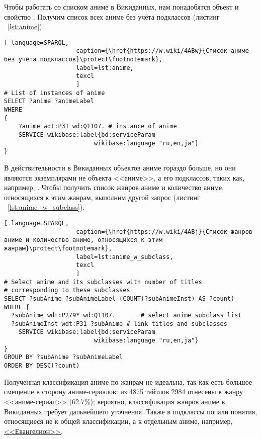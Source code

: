 Чтобы работать со списком аниме в Викиданных, нам понадобятся объект  и свойство . Получим список всех аниме без учёта подклассов (листинг ~\protect\ref{lst:anime}).

\begin{lstlisting}[ language=SPARQL, 
                    caption={\href{https://w.wiki/4ABw}{Список аниме без учёта подклассов}\protect\footnotemark},
                    label=lst:anime,
                    texcl 
                    ]
# List of instances of anime
SELECT ?anime ?animeLabel
WHERE
{
    ?anime wdt:P31 wd:Q1107. # instance of anime
    SERVICE wikibase:label{bd:serviceParam
					     wikibase:language "ru,en,ja"}
}
\end{lstlisting}%

В действительности в Викиданных объектов аниме гораздо больше, но они являются экземплярами не объекта <<аниме>>, а его подклассов, таких как, например, . Чтобы получить список жанров аниме и количество аниме, относящихся к этим жанрам, выполним другой запрос (листинг ~\protect\ref{lst:anime_w_subclass}).

\begin{lstlisting}[ language=SPARQL, 
                    caption={\href{https://w.wiki/4ABj}{Список жанров аниме и количество аниме, относящихся к этим жанрам}\protect\footnotemark},
                    label=lst:anime_w_subclass,
                    texcl 
                    ]
# Select anime and its subclasses with number of titles
# corresponding to these subclasses
SELECT ?subAnime ?subAnimeLabel (COUNT(?subAnimeInst) AS ?count)
WHERE {
  ?subAnime wdt:P279* wd:Q1107.       # select anime subclass list
  ?subAnimeInst wdt:P31 ?subAnime # link titles and subclasses
    SERVICE wikibase:label{bd:serviceParam
					     wikibase:language "ru,en,ja"}
}
GROUP BY ?subAnime ?subAnimeLabel
ORDER BY DESC(?count)
\end{lstlisting}%

Полученная классификация аниме по жанрам не идеальна, так как есть большое смещение в сторону аниме-сериалов: из 4875 тайтлов 2984 отнесены к жанру <<аниме-сериал>> (\num{62,7}\%); вероятно, классификация жанров аниме в Викиданных требует дальнейшего уточнения. Также в подклассы попали понятия, относящиеся не к общей классификации, а к отдельным аниме, например, \href{https://w.wiki/4L5p}{<<Евангелион>>}.

